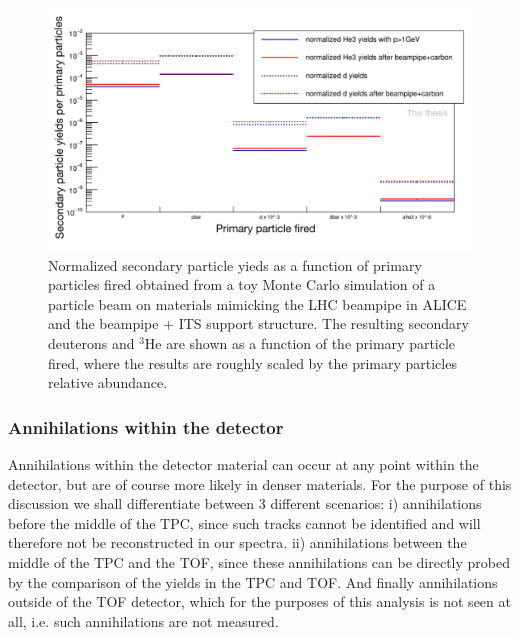 \begin{figure}
    \centering
    \includegraphics[width=\textwidth]{figures/simpleMC_secondaries_G4.png}
    \caption{Normalized secondary particle yieds as a function of primary particles fired obtained from a toy Monte Carlo simulation of a particle beam on materials mimicking the LHC beampipe in ALICE and the beampipe + ITS support structure. The resulting secondary deuterons and $^3\mathrm{He}$ are shown as a function of the primary particle fired, where the results are roughly scaled by the primary particles relative abundance.}
    \label{fig:toyMCGeant4Spallation}
\end{figure}
\subsubsection{Annihilations within the detector}
Annihilations within the detector material can occur at any point within the detector, but are of course more likely in denser materials. For the purpose of this discussion we shall differentiate between 3 different scenarios: i) annihilations before the middle of the TPC, since such tracks cannot be identified and will therefore not be reconstructed in our spectra. ii) annihilations between the middle of the TPC and the TOF, since these annihilations can be directly probed by the comparison of the yields in the TPC and TOF. And finally annihilations outside of the TOF detector, which for the purposes of this analysis is not seen at all, i.e. such annihilations are not measured. \\


